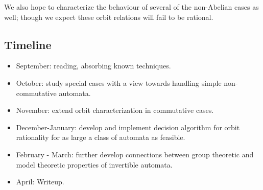 \documentclass[11pt]{article}
\theoremstyle{pleasant}
\newcommand{\0}{\underline{0}}
\newcommand{\1}{\underline{1}}
\newcommand{\2}{\textbf{2}}
\begin{document}
We also hope to characterize the behaviour of several of the non-Abelian cases as well; though we expect these orbit relations will fail to be rational.

\subsection{Timeline}
\begin{itemize}
\item September: reading, absorbing known techniques.

\item October: study special cases with a view towards handling simple non-commutative automata.

\item November: extend orbit characterization in commutative cases.

\item December-January: develop and implement decision algorithm for orbit rationality for as large a class of automata as feasible.

\item February - March: further develop connections between group theoretic and model theoretic properties of invertible automata.

\item April: Writeup.
\end{itemize}

\nocite{*}


\end{document}
